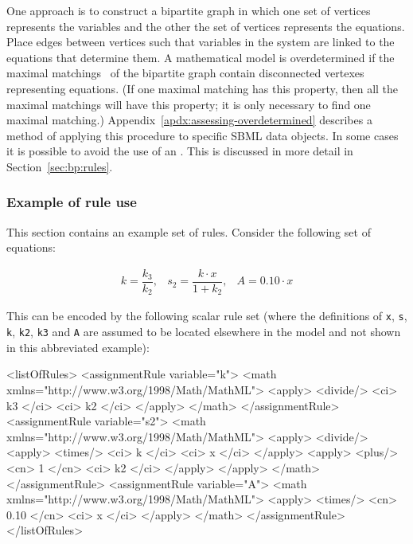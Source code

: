 One approach is to construct a bipartite graph in which
one set of vertices represents the variables and the other the set
of vertices represents the equations.  Place edges between
vertices such that variables in the system are linked to the
equations that determine them.  A mathematical model is 
overdetermined if the maximal matchings~\citep{chartrand_1977} 
of the bipartite graph contain disconnected vertexes representing 
equations.  (If one maximal matching has this property, then all the 
maximal matchings will have this property; \ie it is only necessary 
to find one maximal matching.)  
Appendix~\ref{apdx:assessing-overdetermined} describes
a method of applying this procedure to specific SBML data objects.
In some cases it is possible to avoid the use of an \AlgebraicRule. 
This is discussed in more detail in Section~\ref{sec:bp:rules}.


\subsubsection{Example of rule use}
\label{sec:eg-rule-use}

This section contains an example set of rules.  Consider the
following set of equations:
\begin{linenomath}
  \begin{equation*}
    \begin{array}{lll}
      k = \dfrac{k_3}{k_2}, & s_2 = \dfrac{k \cdot x}{1 + k_2}, & A = 0.10 \cdot x
    \end{array}
  \end{equation*}
\end{linenomath}
This can be encoded by the following scalar rule set (where the
definitions of \texttt{x}, \texttt{s}, \texttt{k}, \texttt{k2},
\texttt{k3} and \texttt{A} are assumed to be located elsewhere in
the model and not shown in this abbreviated example):

\begin{example}
    <listOfRules>
        <assignmentRule variable="k">
            <math xmlns="http://www.w3.org/1998/Math/MathML">
                <apply> <divide/> <ci> k3 </ci> <ci> k2 </ci> </apply>
            </math>
        </assignmentRule>
        <assignmentRule variable="s2">
            <math xmlns="http://www.w3.org/1998/Math/MathML">
                <apply>
                    <divide/>
                        <apply> <times/> <ci> k </ci> <ci> x </ci> </apply>
                        <apply> <plus/> <cn> 1 </cn> <ci> k2 </ci> </apply>
                </apply>
            </math>
        </assignmentRule>
        <assignmentRule variable="A">
            <math xmlns="http://www.w3.org/1998/Math/MathML">
                <apply> <times/> <cn> 0.10 </cn> <ci> x </ci> </apply>
            </math>
        </assignmentRule>
    </listOfRules>
\end{example}


